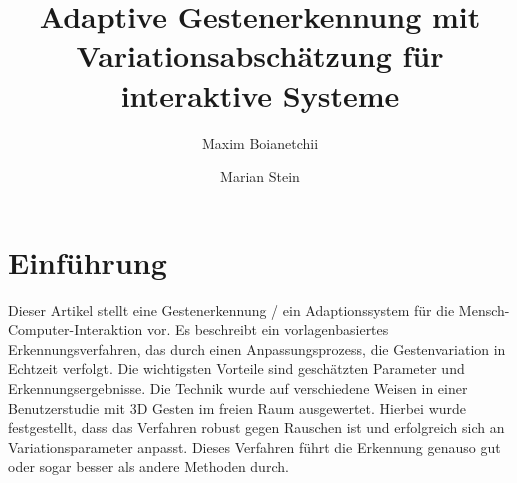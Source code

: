 \documentclass{llncs}
\begin{document}
\pagestyle{headings}

\mainmatter

\title{Adaptive Gestenerkennung mit Variationsabschätzung für interaktive Systeme}


\author{Maxim Boianetchii \and Marian Stein}



\maketitle
\section{Einführung}
Dieser Artikel stellt eine Gestenerkennung / ein Adaptionssystem für die Mensch-Computer-Interaktion vor. Es beschreibt ein vorlagenbasiertes Erkennungsverfahren, das durch einen Anpassungsprozess, die Gestenvariation in Echtzeit verfolgt. Die wichtigsten Vorteile sind geschätzten Parameter und Erkennungsergebnisse. Die Technik wurde auf verschiedene Weisen in einer Benutzerstudie mit 3D Gesten im freien Raum ausgewertet. Hierbei wurde festgestellt, dass das Verfahren robust gegen Rauschen ist und erfolgreich sich an Variationsparameter anpasst. Dieses Verfahren führt die Erkennung genauso gut oder sogar besser als andere Methoden durch.
\end{document}
